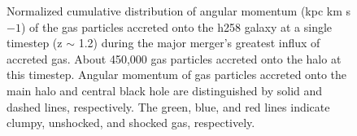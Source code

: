 \documentclass[]{emulateapj}
\begin{document}
\begin{figure}
\centerline{}
\caption[]{ Normalized cumulative distribution of angular momentum (kpc km s${{-1}}$) of the gas particles accreted onto the h258 galaxy at a single timestep (z $\sim$ 1.2) during the major merger's greatest influx of accreted gas. About 450,000 gas particles accreted onto the halo at this timestep. Angular momentum of gas particles accreted onto the main halo and central black hole are distinguished by solid and dashed lines, respectively. The green, blue, and red lines indicate clumpy, unshocked, and shocked gas, respectively.}
\label{hrh258angmom_merger2} 
\end{figure}
\end{document}
